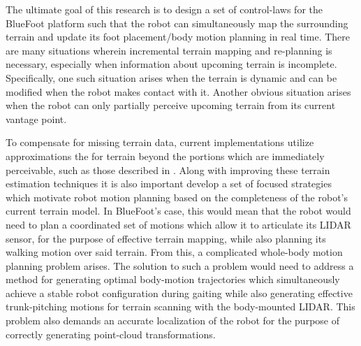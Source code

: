 	The ultimate goal of this research is to design a set of control-laws for the BlueFoot platform such that the robot can simultaneously map the surrounding terrain and update its foot placement/body motion planning in real time. There are many situations wherein incremental terrain mapping and re-planning is necessary, especially when information about upcoming terrain is incomplete. Specifically, one such situation arises when the terrain is dynamic and can be modified when the robot makes contact with it. Another obvious situation arises when the robot can only partially perceive upcoming terrain from its current vantage point.


	To compensate for missing terrain data, current implementations utilize approximations the for terrain beyond the portions which are immediately perceivable, such as those described in \cite{Kolter2009}. Along with improving these terrain estimation techniques it is also important develop a set of focused strategies which motivate robot motion planning based on the completeness of the robot's current terrain model. In BlueFoot's case, this would mean that the robot would need to plan a coordinated set of motions which allow it to articulate its LIDAR sensor, for the purpose of effective terrain mapping, while also planning its walking motion over said terrain. From this, a complicated whole-body motion planning problem arises. The solution to such a problem would need to address a method for generating optimal body-motion trajectories which simultaneously achieve a stable robot configuration during gaiting while also generating effective trunk-pitching motions for terrain scanning with the body-mounted LIDAR. This problem also demands an accurate localization of the robot for the purpose of correctly generating point-cloud transformations. %


